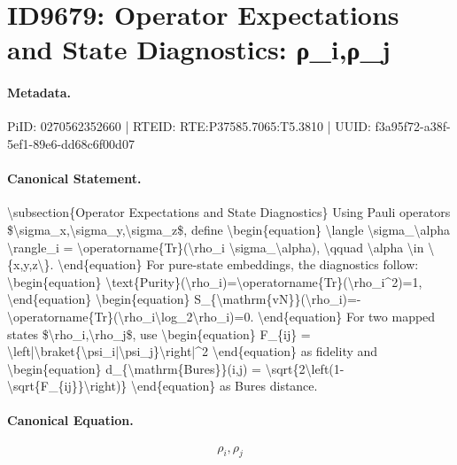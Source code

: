 \section*{ID9679: Operator Expectations and State Diagnostics: ρ\_i,ρ\_j}
\paragraph{Metadata.}
PiID: 0270562352660 | RTEID: RTE:P37585.7065:T5.3810 | UUID: f3a95f72-a38f-5ef1-89e6-dd68c6f00d07

\paragraph{Canonical Statement.}
\textbackslash{}subsection\{Operator Expectations and State Diagnostics\} Using Pauli operators \$\textbackslash{}sigma\_x,\textbackslash{}sigma\_y,\textbackslash{}sigma\_z\$, define \textbackslash{}begin\{equation\} \textbackslash{}langle \textbackslash{}sigma\_\textbackslash{}alpha \textbackslash{}rangle\_i = \textbackslash{}operatorname\{Tr\}(\textbackslash{}rho\_i \textbackslash{}sigma\_\textbackslash{}alpha), \textbackslash{}qquad \textbackslash{}alpha \textbackslash{}in \textbackslash{}\{x,y,z\textbackslash{}\}. \textbackslash{}end\{equation\} For pure-state embeddings, the diagnostics follow: \textbackslash{}begin\{equation\} \textbackslash{}text\{Purity\}(\textbackslash{}rho\_i)=\textbackslash{}operatorname\{Tr\}(\textbackslash{}rho\_i\textasciicircum{}2)=1, \textbackslash{}end\{equation\} \textbackslash{}begin\{equation\} S\_\{\textbackslash{}mathrm\{vN\}\}(\textbackslash{}rho\_i)=-\textbackslash{}operatorname\{Tr\}(\textbackslash{}rho\_i\textbackslash{}log\_2\textbackslash{}rho\_i)=0. \textbackslash{}end\{equation\} For two mapped states \$\textbackslash{}rho\_i,\textbackslash{}rho\_j\$, use \textbackslash{}begin\{equation\} F\_\{ij\} = \textbackslash{}left|\textbackslash{}braket\{\textbackslash{}psi\_i|\textbackslash{}psi\_j\}\textbackslash{}right|\textasciicircum{}2 \textbackslash{}end\{equation\} as fidelity and \textbackslash{}begin\{equation\} d\_\{\textbackslash{}mathrm\{Bures\}\}(i,j) = \textbackslash{}sqrt\{2\textbackslash{}left(1-\textbackslash{}sqrt\{F\_\{ij\}\}\textbackslash{}right)\} \textbackslash{}end\{equation\} as Bures distance.

\paragraph{Canonical Equation.}
\[
\rho_i,\rho_j
\]

